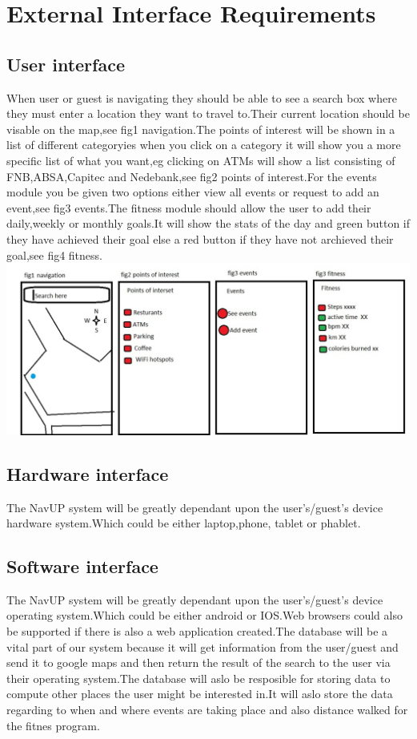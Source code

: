 \documentclass[12pt,a4paper]{article}
\begin{document}


\tableofcontents
\newpage
\section{External Interface Requirements}
\subsection{User interface}
When user or guest is navigating they should be able to see a search box where they must enter a location they want to travel to.Their current location should be visable on the map,see fig1 navigation.The points of interest will be shown in a list of different categoryies when you click on a category it will show you a more specific list of what you want,eg clicking on ATMs will show a list consisting of FNB,ABSA,Capitec and Nedebank,see fig2 points of interest.For the events module you be given two options either view all events or request to add an event,see fig3 events.The fitness module should allow the user to add their daily,weekly or monthly goals.It will show the stats of the day and green button if they have achieved their goal else a red button if they have not archieved their goal,see fig4 fitness.
\includegraphics{userInterface}
\subsection{Hardware interface}
The NavUP system will be greatly dependant upon the user's/guest's device hardware system.Which could be either laptop,phone, tablet or phablet.
\subsection{Software interface}
The NavUP system will be greatly dependant upon the user's/guest's device operating system.Which could be either android or IOS.Web browsers could also be supported if there is also a web application created.The database will be a vital part of our system because it will get information from the user/guest and send it to google maps and then return the result of the search to the user via their operating system.The database will aslo be resposible for storing data to compute other places the user might be interested in.It will aslo store the data regarding to when and where events are taking place and also distance walked for the fitnes program. 
\end{document}
